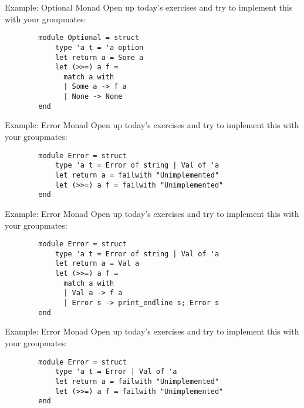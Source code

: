 \documentclass{beamer}
\begin{document}
    
    \begin{frame}[fragile]{Example: Optional Monad}
        Open up today's exercises and try to implement this with your groupmates:
        
        \begin{verbatim}
        module Optional = struct
            type 'a t = 'a option
            let return a = Some a
            let (>>=) a f =
              match a with
              | Some a -> f a
              | None -> None
        end
        \end{verbatim}
    \end{frame}
    
    
    \begin{frame}[fragile]{Example: Error Monad}
        Open up today's exercises and try to implement this with your groupmates:
        
        \begin{verbatim}
        module Error = struct
            type 'a t = Error of string | Val of 'a
            let return a = failwith "Unimplemented"
            let (>>=) a f = failwith "Unimplemented"
        end
        \end{verbatim}
    \end{frame}
    
    
    \begin{frame}[fragile]{Example: Error Monad}
        Open up today's exercises and try to implement this with your groupmates:
        
        \begin{verbatim}
        module Error = struct
            type 'a t = Error of string | Val of 'a
            let return a = Val a
            let (>>=) a f =
              match a with
              | Val a -> f a
              | Error s -> print_endline s; Error s
        end
        \end{verbatim}
    \end{frame}
    
    
    \begin{frame}[fragile]{Example: Error Monad}
        Open up today's exercises and try to implement this with your groupmates:
        
        \begin{verbatim}
        module Error = struct
            type 'a t = Error | Val of 'a
            let return a = failwith "Unimplemented"
            let (>>=) a f = failwith "Unimplemented"
        end
        \end{verbatim}
    \end{frame}
    
\end{document}
